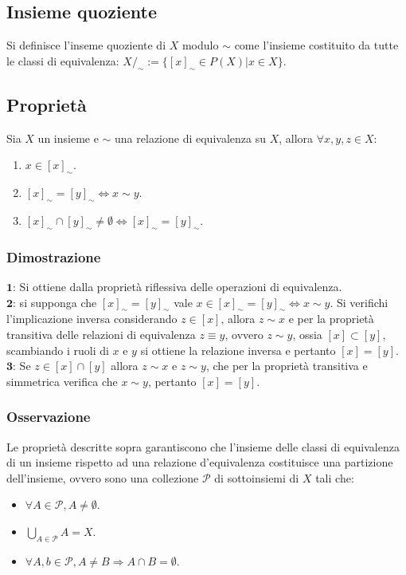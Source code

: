 \subsection{Insieme quoziente}
Si definisce l'inseme quoziente di $X$ modulo $\sim$ come l'insieme costituito da tutte le classi di equivalenza: $X/_\sim:=\{[x]_\sim\in P(X)|x\in X\}$.
\subsection{Propriet\`a}
Sia $X$ un insieme e $\sim$ una relazione di equivalenza su $X$, allora $\forall x,y,z\in X$:
\begin{enumerate}
\item $x\in [x]_\sim$.
\item $[x]_\sim=[y]_\sim\Leftrightarrow x\sim y$.
\item $[x]_\sim\cap[y]_\sim\neq\emptyset\Leftrightarrow [x]_\sim=[y]_\sim$.
\end{enumerate}
\subsubsection{Dimostrazione}
$\mathbf{1}$: Si ottiene dalla propriet\`a riflessiva delle operazioni di equivalenza.\\
$\mathbf{2}$: si supponga che $[x]_\sim=[y]_\sim$ vale $x\in[x]_\sim=[y]_\sim\Leftrightarrow x\sim y$. Si verifichi l'implicazione inversa considerando $z\in[x]$, allora $z\sim 
x$ e per la propriet\`a transitiva delle relazioni di equivalenza $z\equiv y$, ovvero $z\sim y$, ossia $[x]\subset[y]$, scambiando i ruoli di $x$ e $y$ si ottiene la relazione
inversa e pertanto $[x]=[y]$.\\
$\mathbf{3}$: Se $z\in[x]\cap[y]$ allora $z\sim x$ e $z\sim y$, che per la propriet\`a transitiva e simmetrica verifica che $x\sim y$, pertanto $[x]=[y]$.
\subsubsection{Osservazione}
Le propriet\`a descritte sopra garantiscono che l'insieme delle classi di equivalenza di un insieme rispetto ad una relazione d'equivalenza costituisce una partizione 
dell'insieme, ovvero sono una collezione $\mathcal{P}$ di sottoinsiemi di $X$ tali che:
\begin{itemize}
\item $\forall A\in\mathcal{P}, A\neq\emptyset$.
\item $\bigcup\limits_{A\in\mathcal{P}}A=X$.
\item $\forall A,b\in\mathcal{P}, A\neq B\Rightarrow A\cap B=\emptyset$.
\end{itemize}
